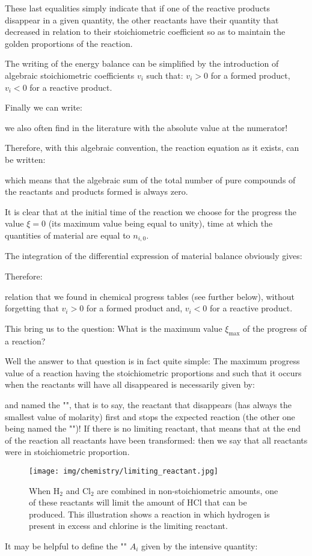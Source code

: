 	These last equalities simply indicate that if one of the reactive products disappear in a given quantity, the other reactants have their quantity that decreased in relation to their stoichiometric coefficient so as to maintain the golden proportions of the reaction.
	
		The writing of the energy balance can be simplified by the introduction of algebraic stoichiometric coefficients $v_i$ such that: $v_i>0$ for a formed product, $v_i<0$ for a reactive product.

	Finally we can write:
	
	we also often find in the literature with the absolute value at the numerator!

	Therefore, with this algebraic convention, the reaction equation as it exists, can be written:
	
	which means that the algebraic sum of the total number of pure compounds of the reactants and products formed is always zero.

	It is clear that at the initial time of the reaction we choose for the progress the value $\xi=0$ (its maximum value being equal to unity), time at which the quantities of material are equal to $n_{i,0}$.

	The integration of the differential expression of material balance obviously gives:
	
	Therefore:
	
	relation that we found in chemical progress tables (see further below), without forgetting that $v_i>0$ for a formed product and, $v_i<0$ for a reactive product.

	This bring us to the question: What is the maximum value $\xi_{\max}$ of the progress of a reaction? 

	Well the answer to that question is in fact quite simple: The maximum progress value of a reaction having the stoichiometric proportions and such that it occurs when the reactants will have all disappeared is necessarily given by:
	
	and named the "", that is to say, the reactant that disappears (has always the smallest value of molarity) first and stops the expected reaction (the other one being named the "")! If there is no limiting reactant, that means that at the end of the reaction all reactants have been transformed: then we say that all reactants were in stoichiometric proportion.
	\begin{figure}[H]
		\centering
		\texttt{[image: img/chemistry/limiting\_reactant.jpg]}
		\caption[Limiting reactant illustration]{When $\mathrm{H}_2$ and $\mathrm{Cl}_{2}$ are combined in non-stoichiometric amounts, one of these reactants will limit the amount of $\mathrm{HCl}$ that can be produced. This illustration shows a reaction in which hydrogen is present in excess and chlorine is the limiting reactant.}
	\end{figure}
	It may be helpful to define the "" $A_i$ given by the intensive quantity:
	
